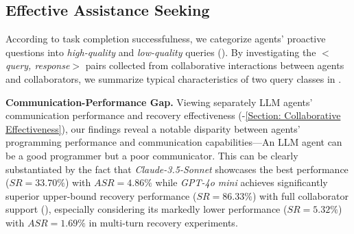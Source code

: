 \subsection{Effective Assistance Seeking}
\label{Appendix:C.4 (Effective Assistance Seeking)}



According to task completion successfulness, we categorize agents' proactive questions into \textit{high-quality} and \textit{low-quality} queries ().
By investigating the $<$\textit{query, response}$>$ pairs collected from collaborative interactions between agents and collaborators, we summarize typical characteristics of two query classes in . 


\textbf{Communication-Performance Gap.} 
Viewing separately LLM agents' communication performance and recovery effectiveness (-\ref{Section: Collaborative Effectiveness}), our findings reveal a notable disparity between agents' programming performance and communication capabilities---An LLM agent can be a good programmer but a poor communicator.
This can be clearly substantiated by the fact that \textit{Claude-3.5-Sonnet} showcases the best performance ($SR=33.70\%$) with $ASR=4.86\%$ while \textit{GPT-4o mini} achieves significantly superior upper-bound recovery performance ($SR=86.33\%$) with full collaborator support (), especially considering its markedly lower performance ($SR=5.32\%$) with $ASR=1.69\%$ in multi-turn recovery experiments. 

